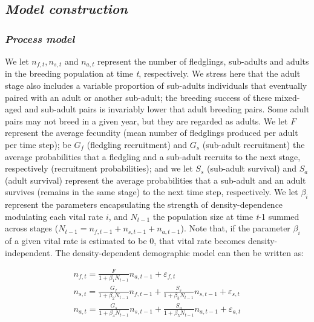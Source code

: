 \documentclass[12pt]{article}
\begin{document}
\subsection*{\textit{Model construction}}

\subsubsection*{\textit{Process model}}

We let $n_{f,t}, n_{s,t}$ and $n_{a,t}$ represent the number of fledglings, sub-adults and adults in the breeding population at time \textit{t}, respectively. We stress here that the adult stage also includes a variable proportion of sub-adults individuals that eventually paired with an adult or another sub-adult; the breeding success of these mixed-aged and sub-adult pairs is invariably lower that adult breeding pairs. Some adult pairs may not breed in a given year, but they are regarded as adults. We let $F$ represent the average fecundity (mean number of fledglings produced per adult per time step); be $G_{f}$ (fledgling recruitment) and $G_{s}$ (sub-adult recruitment) the average probabilities that a fledgling and a sub-adult recruits to the next stage, respectively (recruitment probabilities); and we let $S_{s}$ (sub-adult survival) and $S_{a}$ (adult survival) represent the average probabilities that a sub-adult and an adult survives (remains in the same stage) to the next time step, respectively. We let $\beta_{i}$ represent the parameters encapsulating the strength of density-dependence modulating each vital rate $i$, and $N_{t-1}$ the population size at time \textit{t}-1 summed across stages ($N_{t-1} = n_{f,t-1} + n_{s,t-1} + n_{a,t-1}$). Note that, if the parameter $\beta_{i}$ of a given vital rate is estimated to be 0, that vital rate becomes density-independent. The density-dependent demographic model can then be written as:

\begin{equation}\label{DifEqns}
	\begin{array}
		{l}{n_{f, t}={\frac{F}{1+\beta_{1} N_{ t-1}}} n_{a, t-1}+\varepsilon_{f, t}} \\
		{n_{s, t}={\frac{G_{f}}{1+\beta_{2} N_{ t-1}}} n_{f, t-1}+{\frac{S_{s}}{1+\beta_{3} N_{ t-1}}} n_{s, t-1}+\varepsilon_{s, t}} \\
		{n_{a, t}={\frac{G_{s}}{1+\beta_{4} N_{ t-1}}} n_{s, t-1}+{\frac{S_{a}}{1+\beta_{5} N_{ t-1}}} n_{a, t-1}+\varepsilon_{a, t}}
	\end{array}
\end{equation}
\end{document}
